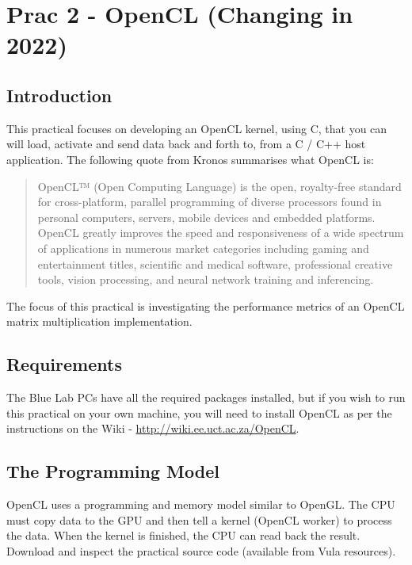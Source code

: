 \newpage
\section{Prac 2 - OpenCL (Changing in 2022)}
\label{sec:Prac2}

\subsection{Introduction}

This practical focuses on  developing an OpenCL kernel, using C, that you can will load, activate and send data back and forth to, from a C / C++ host application. The following quote from Kronos \cite{opencl_khronos} summarises what  OpenCL is:

\begin{quote}
    OpenCL™ (Open Computing Language) is the open, royalty-free standard for cross-platform, parallel programming of diverse processors found in personal computers, servers, mobile devices and embedded platforms. OpenCL greatly improves the speed and responsiveness of a wide spectrum of applications in numerous market categories including gaming and entertainment titles, scientific and medical software, professional creative tools, vision processing, and neural network training and inferencing. \cite{opencl_khronos}
\end{quote}

The focus of this practical is investigating the performance metrics of an OpenCL matrix multiplication implementation.

\subsection{Requirements}
The Blue Lab PCs have all the required packages installed, but if you wish to run this practical on your own machine, you will need to install OpenCL as per the instructions on the Wiki - \href{http://wiki.ee.uct.ac.za/OpenCL}{http://wiki.ee.uct.ac.za/OpenCL}.

\subsection{The Programming Model}
OpenCL uses a programming and memory model similar to OpenGL. The CPU must copy data to the GPU and then tell a kernel (OpenCL worker) to process the data. When the kernel is finished, the CPU can read back the result. Download and inspect the practical source code (available from Vula resources).

